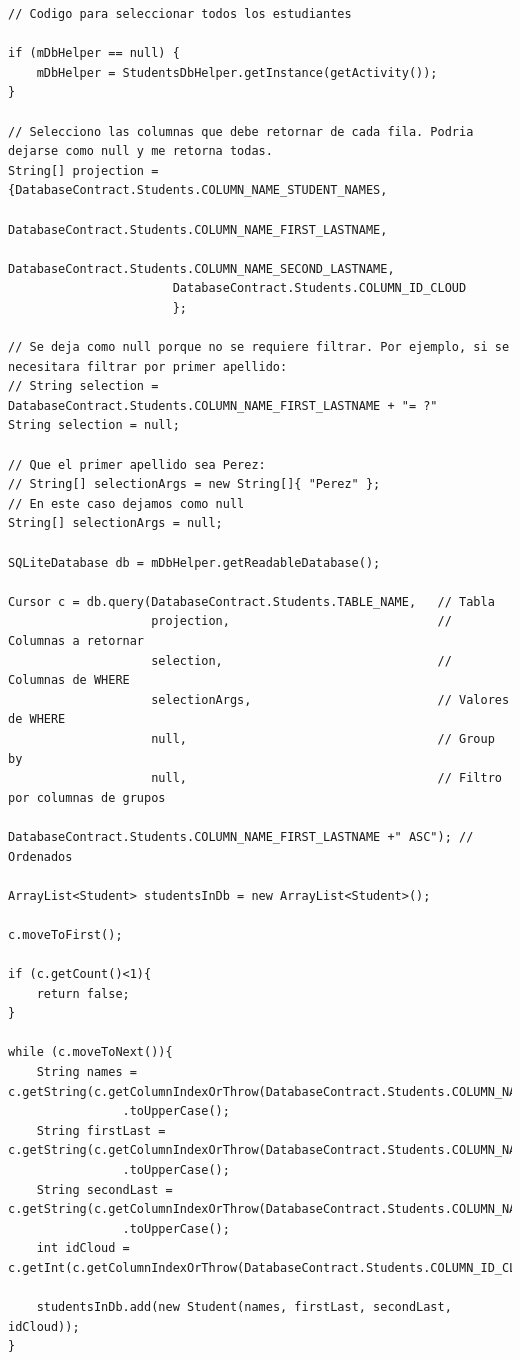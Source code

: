 \documentclass[10pt]{extarticle}
\begin{document}
\begin{lstlisting}
// Codigo para seleccionar todos los estudiantes

if (mDbHelper == null) {
    mDbHelper = StudentsDbHelper.getInstance(getActivity());
}

// Selecciono las columnas que debe retornar de cada fila. Podria dejarse como null y me retorna todas.
String[] projection = {DatabaseContract.Students.COLUMN_NAME_STUDENT_NAMES,
                       DatabaseContract.Students.COLUMN_NAME_FIRST_LASTNAME,
                       DatabaseContract.Students.COLUMN_NAME_SECOND_LASTNAME,
                       DatabaseContract.Students.COLUMN_ID_CLOUD
                       };

// Se deja como null porque no se requiere filtrar. Por ejemplo, si se necesitara filtrar por primer apellido:
// String selection = DatabaseContract.Students.COLUMN_NAME_FIRST_LASTNAME + "= ?"
String selection = null;

// Que el primer apellido sea Perez:
// String[] selectionArgs = new String[]{ "Perez" };
// En este caso dejamos como null
String[] selectionArgs = null;

SQLiteDatabase db = mDbHelper.getReadableDatabase();

Cursor c = db.query(DatabaseContract.Students.TABLE_NAME,   // Tabla
                    projection,                             // Columnas a retornar
                    selection,                              // Columnas de WHERE
                    selectionArgs,                          // Valores de WHERE
                    null,                                   // Group by
                    null,                                   // Filtro por columnas de grupos
                    DatabaseContract.Students.COLUMN_NAME_FIRST_LASTNAME +" ASC"); // Ordenados

ArrayList<Student> studentsInDb = new ArrayList<Student>();

c.moveToFirst();

if (c.getCount()<1){
    return false;
}

while (c.moveToNext()){
    String names = c.getString(c.getColumnIndexOrThrow(DatabaseContract.Students.COLUMN_NAME_STUDENT_NAMES))
    		    .toUpperCase();
    String firstLast = c.getString(c.getColumnIndexOrThrow(DatabaseContract.Students.COLUMN_NAME_FIRST_LASTNAME))
    		    .toUpperCase();
    String secondLast = c.getString(c.getColumnIndexOrThrow(DatabaseContract.Students.COLUMN_NAME_SECOND_LASTNAME))
    			.toUpperCase();
    int idCloud = c.getInt(c.getColumnIndexOrThrow(DatabaseContract.Students.COLUMN_ID_CLOUD));
    
    studentsInDb.add(new Student(names, firstLast, secondLast, idCloud));
}
     
\end{lstlisting}
\end{document}

